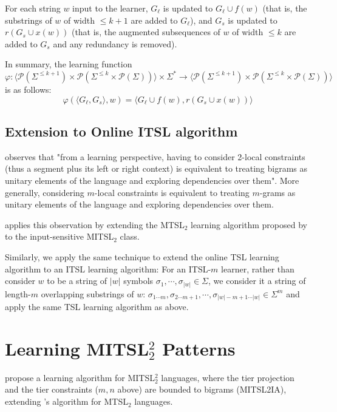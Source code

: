 \documentclass[11pt]{article}
\begin{document}
    For each string $w$ input to the learner, $G_{\ell}$ is updated to $G_{\ell} \cup f(w)$ (that is, the substrings of $w$ of width $ \leq k+1 $ are added to $G_{\ell}$), and $G_s$ is updated to $r \left( G_s \cup x(w) \right)$ (that is, the augmented subsequences of $w$ of width $ \leq k$ are added to $G_s$ and any redundancy is removed).

    In summary, the learning function $\varphi : \langle \mathcal{P} \left( \Sigma^{\leq k+1} \right) \times \mathcal{P} \left( \Sigma^{\leq k} \times \mathcal{P} \left( \Sigma \right) \right) \rangle \times \Sigma^* \rightarrow \langle \mathcal{P} \left( \Sigma^{\leq k+1} \right) \times \mathcal{P} \left( \Sigma^{\leq k} \times \mathcal{P} \left( \Sigma \right) \right) \rangle $ is as follows:
    $$\varphi \left( \langle  G_{\ell}, G_s \rangle, w \right) = \langle G_{\ell} \cup f(w), r \left( G_s \cup x(w) \right) \rangle$$

\subsection{Extension to Online ITSL algorithm}

    \citet{de2021learning} observes that "from a learning perspective, having to consider 2-local constraints (thus a segment plus its left or right context) is equivalent to treating bigrams as unitary elements of the language and exploring dependencies over them".
    More generally, considering $m$-local constraints is equivalent to treating $m$-grams as unitary elements of the language and exploring dependencies over them.

    \citet{de2021learning} applies this observation by extending the MTSL$_2$ learning algorithm proposed by \citet{McMullinSCIL2019} to the input-sensitive MITSL$_2$ class.

    Similarly, we apply the same technique to extend the online TSL learning algorithm to an ITSL learning algorithm:
    For an ITSL-$m$ learner, rather than consider $w$ to be a string of $|w|$ symbols $\sigma_1, \cdots, \sigma_{|w|} \in \Sigma$, we consider it a string of length-$m$ overlapping substrings of $w$: $\sigma_{1 \cdots m}, \sigma_{2 \cdots m+1}, \cdots, \sigma_{|w|-m+1 \cdots |w|} \in \Sigma^m$ and apply the same TSL learning algorithm as above.
    


    
       
 \section{Learning MITSL$^2_2$ Patterns}
\citet{de2021learning} propose a learning algorithm for MITSL$^2_2$ languages, where the tier projection and the tier constraints ($m,n$ above) are bounded to bigrams (MITSL2IA),  extending \citet{McMullinSCIL2019}'s algorithm for MTSL$_2$ languages.\@ 
\end{document}
